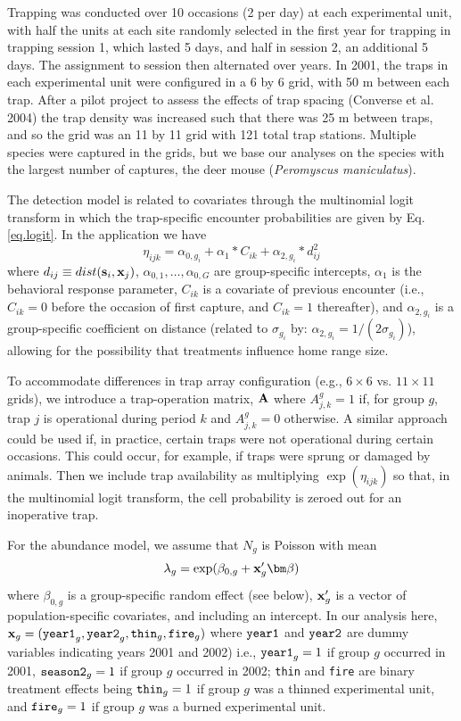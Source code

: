 Trapping was conducted over 10 occasions (2 per day) at each
experimental unit, with half the units at each site randomly selected
in the first year for trapping in trapping session 1, which lasted 5
days, and half in session 2, an additional 5 days. The assignment to
session then alternated over years.  In 2001, the traps in each
experimental unit were configured in a 6 by 6 grid, with 50 m between
each trap. After a pilot project to assess the effects of trap spacing
(Converse et al. 2004) the trap density was increased such that there
was 25 m between traps, and so the grid was an 11 by 11 grid with 121
total trap stations. Multiple species were captured in the grids, but
we base our analyses on the species with the largest number of
captures, the deer mouse ({\it Peromyscus maniculatus}).

The detection model is related to covariates through the multinomial
logit transform in which the trap-specific encounter probabilities are
given by Eq. \ref{eq.logit}.  In the application we have
\[
\eta_{ijk}=\alpha_{0,g_{i}} + \alpha_{1}*C_{ik}+\alpha_{2,g_{i}}*d_{ij}^{2} 
\]
where $d_{ij} \equiv dist({\bf s}_{i},{\bf x}_{j})$,
$\alpha_{0,1},\ldots, \alpha_{0,G}$ are group-specific intercepts,
$\alpha_{1}$ is the behavioral response parameter, $C_{ik}$ is a
covariate of previous encounter (i.e., $C_{ik} = 0$ before the
occasion of first capture, and $C_{ik} = 1$ thereafter), and
$\alpha_{2,g_{i}}$ is a group-specific coefficient on distance
(related to $\sigma_{g_{i}}$ by: $\alpha_{2,g_{i}} =
1/(2\sigma_{g_{i}})$), allowing for the possibility that treatments
influence home range size.

To accommodate differences in trap array configuration (e.g., $6
\times 6$ vs. $11 \times 11$ grids), we introduce a trap-operation
matrix, ${\bf A}$ where $A^{g}_{j,k}=1$ if, for group $g$, trap $j$ is
operational during period $k$ and $A^{g}_{j,k} = 0$ otherwise. A
similar approach could be used if, in practice, certain traps were not
operational during certain occasions. This could occur, for example,
if traps were sprung or damaged by animals.  Then we include trap
availability as multiplying $\exp(\eta_{ijk})$ so that, in the
multinomial logit transform, the cell probability is zeroed out for an
inoperative trap.

For the abundance model, we assume that $N_{g}$ is Poisson with mean
\[
\lambda_{g} = \exp( \beta_{0,g} +  {\bf x}'_{g} {\bm \beta} )
\]
where $\beta_{0,g}$ is a group-specific random effect (see below),
 ${\bf x}'_{g}$ is a vector of population-specific covariates,
and including an intercept.  In our analysis here, ${\bf x}_{g} = 
(\mbox{\tt year1}_{g}, \mbox{\tt year2}_{g}, \mbox{\tt thin}_{g},
\mbox{\tt fire}_{g})$ where $\mbox{\tt year1}$ and $\mbox{\tt year2}$
are dummy variables indicating years 2001 and 2002) i.e., $\mbox{\tt
  year1}_{g} = 1$ if group $g$ occurred in 2001, $\mbox{\tt
  season2}_{g} = 1$ if group $g$ occurred in 2002; \mbox{\tt thin} and
\mbox{\tt fire}
are binary treatment effects being $\mbox{\tt thin}_{g}=1$ if group $g$ was a
thinned experimental unit, and $\mbox{\tt fire}_{g} = 1$ if group $g$ was a
burned experimental unit.

